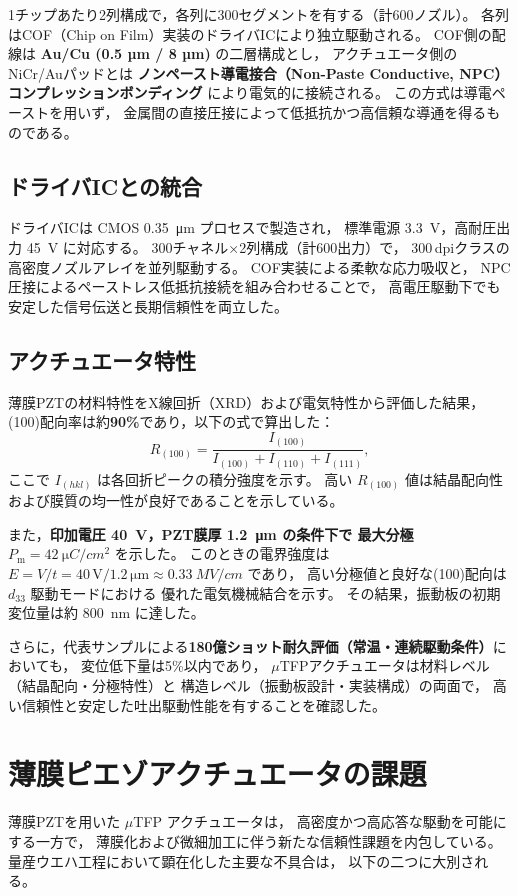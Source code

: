\documentclass[conference]{IEEEtran}
\begin{document}
1チップあたり2列構成で，各列に300セグメントを有する（計600ノズル）。
各列はCOF（Chip on Film）実装のドライバICにより独立駆動される。
COF側の配線は \textbf{Au/Cu (0.5 µm / 8 µm)} の二層構成とし，
アクチュエータ側のNiCr/Auパッドとは
\textbf{ノンペースト導電接合（Non-Paste Conductive, NPC）コンプレッションボンディング}
により電気的に接続される。
この方式は導電ペーストを用いず，
金属間の直接圧接によって低抵抗かつ高信頼な導通を得るものである。

\subsection{ドライバICとの統合}
ドライバICは CMOS \SI{0.35}{\micro\metre} プロセスで製造され，
標準電源 \SI{3.3}{V}，高耐圧出力 \SI{45}{V} に対応する。
300チャネル×2列構成（計600出力）で，
300\,dpiクラスの高密度ノズルアレイを並列駆動する。
COF実装による柔軟な応力吸収と，
NPC圧接によるペーストレス低抵抗接続を組み合わせることで，
高電圧駆動下でも安定した信号伝送と長期信頼性を両立した。

\subsection{アクチュエータ特性}
薄膜PZTの材料特性をX線回折（XRD）および電気特性から評価した結果，
(100)配向率は約\textbf{90\%}であり，以下の式で算出した：
\[
  R_{(100)} = \frac{I_{(100)}}{I_{(100)} + I_{(110)} + I_{(111)}},
\]
ここで $I_{(hkl)}$ は各回折ピークの積分強度を示す。
高い $R_{(100)}$ 値は結晶配向性および膜質の均一性が良好であることを示している。

また，\textbf{印加電圧 \SI{40}{V}，PZT膜厚 \SI{1.2}{\micro m} の条件下で
最大分極 $P_\mathrm{m}=\SI{42}{\micro C/cm^2}$} を示した。
このときの電界強度は
$E = V/t = 40\,\mathrm{V} / 1.2\,\mathrm{\mu m} \approx \SI{0.33}{MV/cm}$ であり，
高い分極値と良好な(100)配向は $d_{33}$ 駆動モードにおける
優れた電気機械結合を示す。
その結果，振動板の初期変位量は約 \SI{800}{nm} に達した。

さらに，代表サンプルによる\textbf{180億ショット耐久評価（常温・連続駆動条件）}においても，
変位低下量は5\%以内であり，
$\mu$TFPアクチュエータは材料レベル（結晶配向・分極特性）と
構造レベル（振動板設計・実装構成）の両面で，
高い信頼性と安定した吐出駆動性能を有することを確認した。

\section{薄膜ピエゾアクチュエータの課題}
薄膜PZTを用いた $\mu$TFP アクチュエータは，
高密度かつ高応答な駆動を可能にする一方で，
薄膜化および微細加工に伴う新たな信頼性課題を内包している。
量産ウエハ工程において顕在化した主要な不具合は，
以下の二つに大別される。
\end{document}

